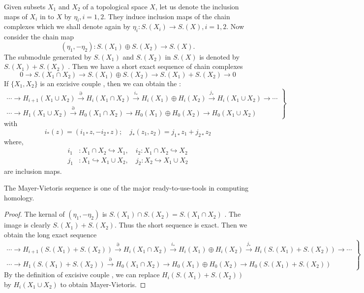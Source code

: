 \documentclass[../main.tex]{subfiles}
\begin{document}
\begin{theorem}{}{}
    Given subsets $X_1$ and $X_2$ of a topological space $X$, let us denote the inclusion maps of $X_i$ in to $X$ by $\eta_i, i = 1, 2$. They induce inclusion maps of the chain complexes which we shall denote again by $\eta_i: S.(X_i) \to S.(X), i = 1, 2$. Now consider the chain map
\[
(\eta_1, -\eta_2): S.(X_1) \oplus S.(X_2) \to S.(X).
\] The submodule generated by $S.(X_1)$ and $S.(X_2)$ in $S.(X)$ is denoted by $S.(X_1) + S.(X_2)$ . Then we have a short exact sequence of chain complexes
\[
0 \to S.(X_1 \cap X_2) \to S.(X_1) \oplus S.(X_2) \to S.(X_1) + S.(X_2) \to 0 
\]If $\{X_1, X_2\}$ is an excisive couple , then we can obtain the :
\[
\left.
\begin{array}{l}
\cdots \to H_{i+1}(X_1 \cup X_2) \xrightarrow{\partial} H_i(X_1 \cap X_2) \xrightarrow{i_*} H_i(X_1) \oplus H_i(X_2) \xrightarrow{j_*} H_i(X_1 \cup X_2) \to \cdots \\
\cdots \to H_1(X_1 \cup X_2) \xrightarrow{\partial} H_0(X_1 \cap X_2) \to H_0(X_1) \oplus H_0(X_2) \to H_0(X_1 \cup X_2)
\end{array}
\right\}
\]
with
\[
i_*(z) = (i_{1*}z, -i_{2*}z); \quad j_*(z_1, z_2) = j_{1*}z_1 + j_{2*}z_2 
\]
where,
\begin{align*}
i_1 &: X_1 \cap X_2 \hookrightarrow X_1, \quad i_2 : X_1 \cap X_2 \hookrightarrow X_2 \\
j_1 &: X_1 \hookrightarrow X_1 \cup X_2, \quad j_2 : X_2 \hookrightarrow X_1 \cup X_2
\end{align*}
are inclusion maps.
\end{theorem}
\begin{remark}
     The Mayer-Vietoris sequence is one of the major ready-to-use-tools in computing homology.
\end{remark}
\begin{proof}
    The kernal of \(  \left( \eta _1 ,-\eta _2  \right)   \) is \(  S.\left( X_1 \right)\cap S.\left( X_2 \right)= S.\left( X_1\cap X_2 \right)     \)  . The image is clearly \(  S.\left( X_1 \right)+ S.\left( X_2 \right)    \). Thus the short sequence is exact. Then we obtain the long exact sequence \[
\left.
\begin{array}{l}
\cdots \to H_{i+1}( S.(X_1) + S.(X_2) ) \xrightarrow{\partial} H_i(X_1 \cap X_2) \xrightarrow{i_*} H_i(X_1) \oplus H_i(X_2) \xrightarrow{j_*} H_i( S.(X_1) + S.(X_2) ) \to \cdots \\
\cdots \to H_1( S.(X_1) + S.(X_2) ) \xrightarrow{\partial} H_0(X_1 \cap X_2) \to H_0(X_1) \oplus H_0(X_2) \to H_0( S.(X_1) + S.(X_2) )
\end{array}
\right\}
\]
By the definition of excisive couple , we can replace \(   H_i( S.(X_1) + S.(X_2) )   \) by \(  H_{i}\left( X_1\cup X_2 \right)   \) to obtain Mayer-Vietoris.  
\end{proof}
\end{document}
